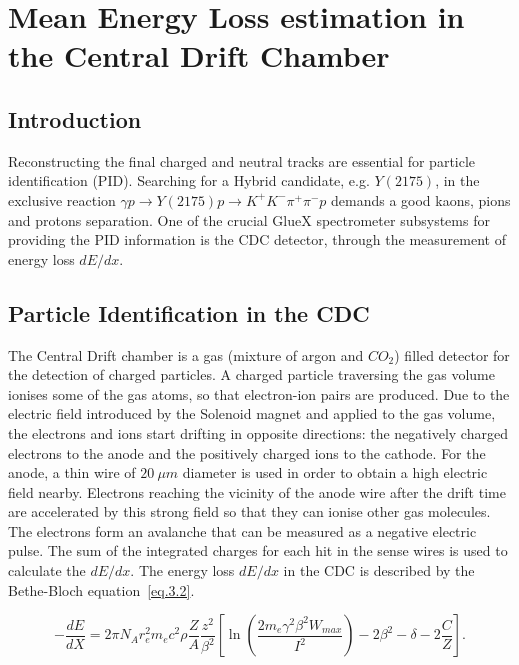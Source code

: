 \section{Mean Energy Loss estimation in the Central Drift Chamber}
\label{p3}

\subsection{Introduction}

Reconstructing the final charged and neutral tracks are essential for particle identification (PID). Searching for a Hybrid candidate, e.g. $Y(2175)$, in the exclusive reaction $\gamma p \rightarrow Y(2175) p \rightarrow K^{+}K^{-}\pi^{+}\pi^{-}p$ demands a good kaons, pions and protons separation. One of the crucial GlueX spectrometer subsystems for providing the PID information is the CDC detector, through the measurement of energy loss $dE/dx$.

\subsection{Particle Identification in the CDC}

The Central Drift chamber is a gas (mixture of argon and $CO_{2}$) filled detector for the detection of charged particles. A charged particle traversing the gas volume ionises some of the gas atoms, so that electron-ion pairs are produced. Due to the electric field introduced by the Solenoid magnet and applied to the gas volume, the electrons and ions start drifting in opposite directions: the negatively charged electrons to the anode and the positively charged ions to the cathode. For the anode, a thin wire of $20~\mu m$ diameter is used in order to obtain a high electric field nearby. Electrons reaching the vicinity of the anode wire after the drift time are accelerated by this strong field so that they can ionise other gas molecules. The electrons form an avalanche that can be measured as a negative electric pulse. The sum of the integrated charges for each hit in the sense wires is used to calculate the $dE/dx$.
The energy loss $dE/dx$ in the CDC is described by the Bethe-Bloch equation~\ref{eq.3.2}.

\begin{equation}
    \label{eq.3.2}
    -\frac{dE}{dX} = 2 \pi N_A r_e^2 m_e c^2 \rho \frac{Z}{A} \frac{z^2}{\beta^2} \left [ \ln \left( \frac{2 m_e \gamma^2 \beta^2 W_{max}}{I^2} \right) - 2 \beta^2 - \delta - 2\frac{C}{Z} \right].
\end{equation}

